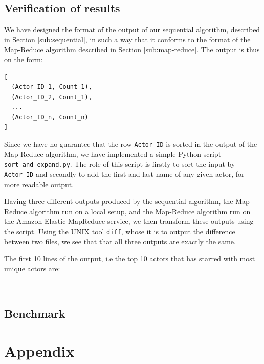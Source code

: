 \documentclass[a4paper,11pt]{article}
\begin{document}
\subsection{Verification of results}
We have designed the format of the output of our sequential algorithm, described in Section \ref{sub:sequential}, in such a way that it conforms to the format of the Map-Reduce algorithm described in Section \ref{sub:map-reduce}. 
The output is thus on the form:
\begin{verbatim}
[ 
  (Actor_ID_1, Count_1),
  (Actor_ID_2, Count_1),
  ...
  (Actor_ID_n, Count_n)
]
\end{verbatim}
Since we have no guarantee that the row \texttt{Actor\_ID} is sorted in the output of the Map-Reduce algorithm, we have implemented a simple Python script \texttt{sort\_and\_expand.py}. 
The role of this script is firstly to sort the input by \texttt{Actor\_ID} and secondly to add the first and last name of any given actor, for more readable output.

Having three different outputs produced by the sequential algorithm, the Map-Reduce algorithm run on a local setup, and the Map-Reduce algorithm run on the Amazon Elastic MapReduce service, we then transform these outputs using the script.
Using the UNIX tool \texttt{diff}, whose it is to output the difference between two files, we see that that all three outputs are exactly the same.

The first 10 lines of the output, i.e the top 10 actors that has starred with most unique actors are: 
\begin{verbatim}
	
\end{verbatim}





\subsection{Benchmark}

\section{Appendix}
\end{document}
